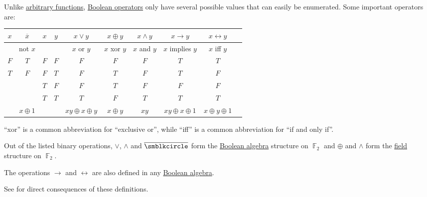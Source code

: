 \begin{definition}\label{def:standard_boolean_operators}
  Unlike \hyperref[def:function]{arbitrary functions}, \hyperref[def:boolean_operator]{Boolean operators} only have several possible values that can easily be enumerated. Some important operators are:
  \begin{center}
    \begin{tabular}{c | c || c c | c c c c c c}
      \( x \) & \( \overline{x} \) & \( x \) & \( y \) & \( x \vee y \)             & \( x \oplus y \)    & \( x \wedge y \)        & \( x \rightarrow y \)   & \( x \leftrightarrow y \) \\
      \hline
              & not \( x \)        &         &         & \( x \) or \( y \)         & \( x \) xor \( y \) & \( x \) and \( y \)     & \( x \) implies \( y \) & \( x \) iff \( y \)       \\
      \hline
      \( F \) & \( T \)            & \( F \) & \( F \) & \( F \)                    & \( F \)             & \( F \)                 & \( T \)                 & \( T \)                   \\
      \( T \) & \( F \)            & \( F \) & \( T \) & \( F \)                    & \( T \)             & \( F \)                 & \( T \)                 & \( F \)                   \\
              &                    & \( T \) & \( F \) & \( F \)                    & \( T \)             & \( F \)                 & \( F \)                 & \( F \)                   \\
              &                    & \( T \) & \( T \) & \( T \)                    & \( F \)             & \( T \)                 & \( T \)                 & \( T \)                   \\
      \hline
              & \( x \oplus 1 \)   &         &         & \( xy \oplus x \oplus y \) & \( x \oplus y \)    & \( xy \)            & \( xy \oplus x \oplus 1 \) & \( x \oplus y \oplus 1 \)
    \end{tabular}
  \end{center}
\end{definition}
\begin{comments}
  \item \enquote{xor} is a common abbreviation for \enquote{exclusive or}, while \enquote{iff} is a common abbreviation for \enquote{if and only if}.

  \item Out of the listed binary operations, \( \vee \), \( \wedge \) and \( \overline{\anon} \) form the \hyperref[def:boolean_algebra]{Boolean algebra} structure on \( \BbbF_2 \) and \( \oplus \) and \( \wedge \) form the \hyperref[def:field]{field} structure on \( \BbbF_2 \).

  \item The operations \( \rightarrow \) and \( \leftrightarrow \) are also defined in any \hyperref[def:boolean_algebra]{Boolean algebra}.

  \item See  for direct consequences of these definitions.
\end{comments}


